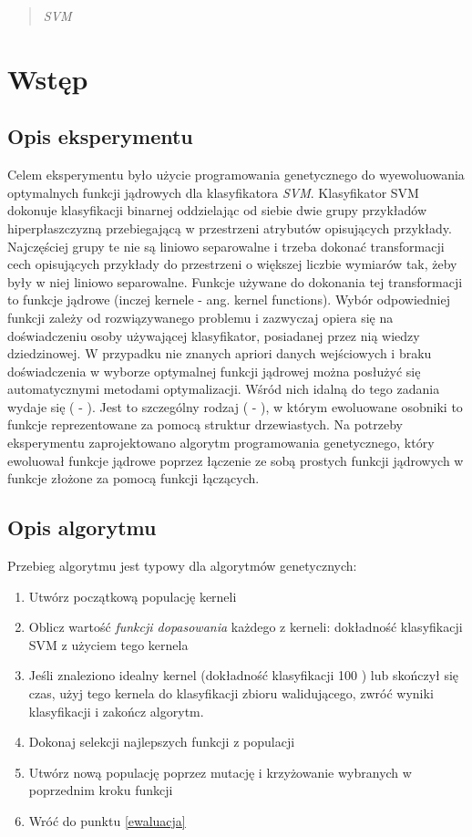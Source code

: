 \documentclass{article}
\begin{document}



\begin{abstract}
\emph{SVM} 
\end{abstract}


\section{Wstęp}
	\subsection{Opis eksperymentu}
	Celem eksperymentu było użycie programowania genetycznego do wyewoluowania optymalnych funkcji jądrowych dla klasyfikatora \emph{SVM}.
	Klasyfikator SVM dokonuje klasyfikacji binarnej oddzielając od siebie dwie grupy przykładów hiperpłaszczyzną przebiegającą w przestrzeni atrybutów opisujących przykłady. Najczęściej grupy te nie są liniowo separowalne i trzeba dokonać transformacji cech opisujących przykłady do przestrzeni o większej liczbie wymiarów tak, żeby były w niej liniowo separowalne. Funkcje używane do dokonania tej transformacji to funkcje jądrowe  (inczej kernele  - ang. kernel functions). Wybór odpowiedniej funkcji zależy od rozwiązywanego problemu i zazwyczaj opiera się na doświadczeniu osoby używającej klasyfikator, posiadanej przez nią wiedzy dziedzinowej. W przypadku nie znanych apriori danych wejściowych i braku doświadczenia w wyborze optymalnej funkcji jądrowej można posłużyć się automatycznymi metodami optymalizacji. Wśród nich idalną do tego zadania wydaje się  ( - ). Jest to szczególny rodzaj  ( - ), w którym ewoluowane osobniki to funkcje reprezentowane za pomocą struktur drzewiastych.
	Na potrzeby eksperymentu zaprojektowano algorytm programowania genetycznego, który ewoluował funkcje jądrowe poprzez łączenie ze sobą prostych funkcji jądrowych w funkcje złożone za pomocą funkcji łączących.

\subsection{Opis algorytmu}
	Przebieg algorytmu jest typowy dla algorytmów genetycznych:
\begin{enumerate}
\item Utwórz początkową populację kerneli
\item \label{ewaluacja} Oblicz wartość \textit{funkcji dopasowania} każdego z kerneli: dokładność klasyfikacji SVM z użyciem tego kernela
\item Jeśli znaleziono idealny kernel (dokładność klasyfikacji 100 ) lub skończył się czas, użyj tego kernela do klasyfikacji zbioru walidującego, zwróć wyniki klasyfikacji i zakończ algorytm.
\item Dokonaj selekcji najlepszych funkcji z populacji
\item Utwórz nową populację poprzez mutację i krzyżowanie wybranych w poprzednim kroku funkcji
\item Wróć do punktu \ref{ewaluacja}
\end{enumerate}
\end{document}
